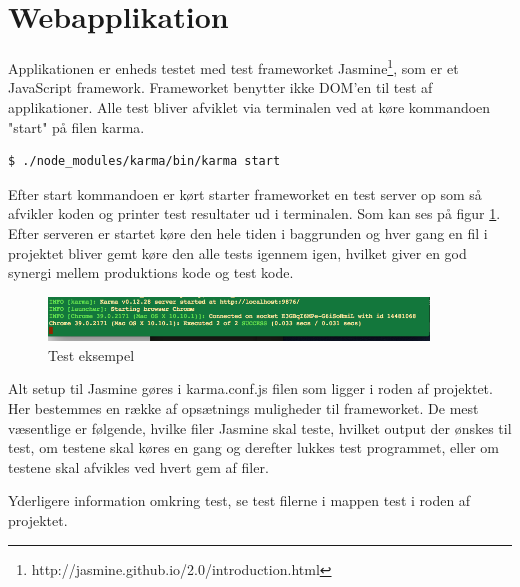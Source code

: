 \section{Webapplikation}
Applikationen er enheds testet med test frameworket Jasmine\footnote{http://jasmine.github.io/2.0/introduction.html}, som er et JavaScript framework. Frameworket benytter ikke DOM'en til test af applikationer. Alle test bliver afviklet via terminalen ved at køre kommandoen "start" på filen karma.\\

\begin{lstlisting}[language=bash]
	$ ./node_modules/karma/bin/karma start
\end{lstlisting}

Efter start kommandoen er kørt starter frameworket en test server op som så afvikler koden og printer test resultater ud i terminalen. Som kan ses på figur \ref{fig:test_eksempel}. Efter serveren er startet køre den hele tiden i baggrunden og hver gang en fil i projektet bliver gemt køre den alle tests igennem igen, hvilket giver en god synergi mellem produktions kode og test kode.  

\begin{figure}[H]
	\centering
	\includegraphics[width=0.9\textwidth]{Billeder/Test/test_exampel.png}
	\vspace{-0.0cm}
	\caption{Test eksempel}
	\label{fig:test_eksempel}
\end{figure}

Alt setup til Jasmine gøres i karma.conf.js filen som ligger i roden af projektet. Her bestemmes en række af opsætnings muligheder til frameworket. De mest væsentlige er følgende, hvilke filer Jasmine skal teste, hvilket output der ønskes til test, om testene skal køres en gang og derefter lukkes test programmet, eller om testene skal afvikles ved hvert gem af filer. 

Yderligere information omkring test, se test filerne i mappen test i roden af projektet.